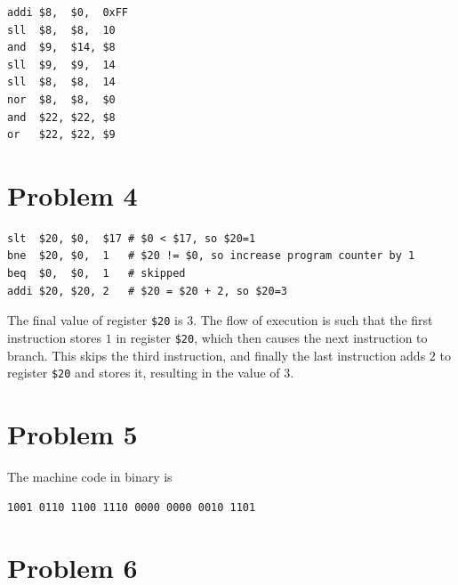 \documentclass[12pt]{article}
\begin{document}
\begin{verbatim}
addi $8,  $0,  0xFF
sll  $8,  $8,  10
and  $9,  $14, $8
sll  $9,  $9,  14
sll  $8,  $8,  14
nor  $8,  $8,  $0
and  $22, $22, $8
or   $22, $22, $9
\end{verbatim}

\section*{Problem 4}

\begin{verbatim}
slt  $20, $0,  $17 # $0 < $17, so $20=1
bne  $20, $0,  1   # $20 != $0, so increase program counter by 1
beq  $0,  $0,  1   # skipped
addi $20, $20, 2   # $20 = $20 + 2, so $20=3
\end{verbatim}
The final value of register \texttt{\$20} is \(3\). The flow of execution is such that the first instruction stores \(1\) in register
\texttt{\$20}, which then causes the next instruction to branch. This skips the third instruction, and finally the last instruction adds
\(2\) to register \texttt{\$20} and stores it, resulting in the value of \(3\).

\section*{Problem 5}

The machine code in binary is
\begin{verbatim}
1001 0110 1100 1110 0000 0000 0010 1101
\end{verbatim}

\section*{Problem 6}
\end{document}
